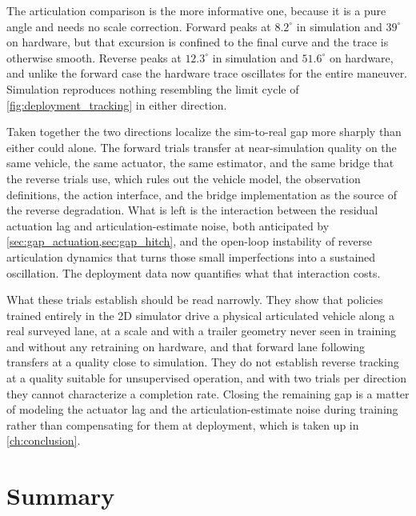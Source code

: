 The articulation comparison is the more informative one, because it is a pure angle and needs no scale correction. Forward peaks at $8.2^\circ$ in simulation and $39^\circ$ on hardware, but that excursion is confined to the final curve and the trace is otherwise smooth. Reverse peaks at $12.3^\circ$ in simulation and $51.6^\circ$ on hardware, and unlike the forward case the hardware trace oscillates for the entire maneuver. Simulation reproduces nothing resembling the limit cycle of \cref{fig:deployment_tracking} in either direction.

Taken together the two directions localize the sim-to-real gap more sharply than either could alone. The forward trials transfer at near-simulation quality on the same vehicle, the same actuator, the same estimator, and the same bridge that the reverse trials use, which rules out the vehicle model, the observation definitions, the action interface, and the bridge implementation as the source of the reverse degradation. What is left is the interaction between the residual actuation lag and articulation-estimate noise, both anticipated by \cref{sec:gap_actuation,sec:gap_hitch}, and the open-loop instability of reverse articulation dynamics that turns those small imperfections into a sustained oscillation. The deployment data now quantifies what that interaction costs.

What these trials establish should be read narrowly. They show that policies trained entirely in the 2D simulator drive a physical articulated vehicle along a real surveyed lane, at a scale and with a trailer geometry never seen in training and without any retraining on hardware, and that forward lane following transfers at a quality close to simulation. They do not establish reverse tracking at a quality suitable for unsupervised operation, and with two trials per direction they cannot characterize a completion rate. Closing the remaining gap is a matter of modeling the actuator lag and the articulation-estimate noise during training rather than compensating for them at deployment, which is taken up in \cref{ch:conclusion}.

\section{Summary}

